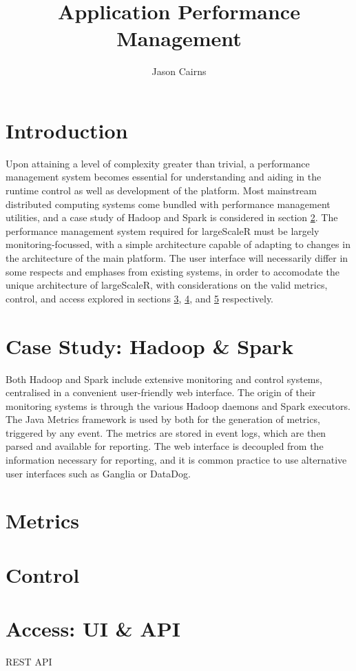 \documentclass[a4paper,10pt]{article}
\begin{document}
\title{Application Performance Management}
\author{Jason Cairns}
  
\maketitle{}

\section{Introduction}

Upon attaining a level of complexity greater than trivial, a performance
management system becomes essential for understanding and aiding in the runtime
control as well as development of the platform.
Most mainstream distributed computing systems come bundled with performance
management utilities, and a case study of Hadoop and Spark is considered in
section \ref{hscs}.
The performance management system required for largeScaleR must be largely
monitoring-focussed, with a simple architecture capable of adapting to changes
in the architecture of the main platform.
The user interface will necessarily differ in some respects and emphases from
existing systems, in order to accomodate the unique architecture of
largeScaleR, with considerations on the valid metrics, control, and access
explored in sections \ref{metr}, \ref{conto}, and \ref{acces} respectively.

\section{Case Study: Hadoop \& Spark}\label{hscs}

Both Hadoop and Spark include extensive monitoring and control systems,
centralised in a convenient user-friendly web interface.
The origin of their monitoring systems is through the various Hadoop daemons
and Spark executors.
The Java Metrics framework is used by both for the generation of metrics,
triggered by any event.
The metrics are stored in event logs, which are then parsed and available for
reporting.
The web interface is decoupled from the information necessary for reporting,
and it is common practice to use alternative user interfaces such as Ganglia or
DataDog.


\section{Metrics}\label{metr}

\section{Control}\label{conto}

\section{Access: UI \& API}\label{acces}

REST API

\printbibliography
\end{document}
